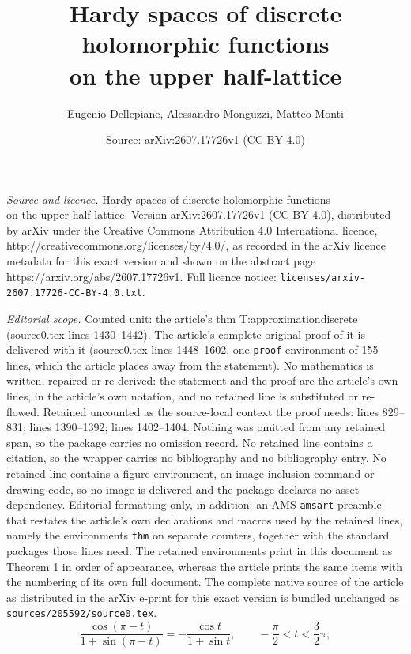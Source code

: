 \documentclass[10pt,a4paper]{amsart}
\title{Hardy spaces of discrete holomorphic functions \\on the upper half-lattice}
\author{Eugenio Dellepiane, Alessandro Monguzzi, Matteo Monti}
\date{Source: arXiv:2607.17726v1 (CC BY 4.0)}
\begin{document}
\maketitle

\noindent\emph{Source and licence.} Hardy spaces of discrete holomorphic functions \\on the upper half-lattice. Version arXiv:2607.17726v1 (CC BY 4.0), distributed by arXiv under the Creative Commons Attribution 4.0 International licence, http://creativecommons.org/licenses/by/4.0/, as recorded in the arXiv licence metadata for this exact version and shown on the abstract page https://arxiv.org/abs/2607.17726v1. Full licence notice: \texttt{licenses/arxiv-2607.17726-CC-BY-4.0.txt}.\par\smallskip

\noindent\textit{Editorial scope.} Counted unit: the article's thm T:approximationdiscrete (source0.tex lines 1430--1442). The article's complete original proof of it is delivered with it (source0.tex lines 1448--1602, one \texttt{proof} environment of 155 lines, which the article places away from the statement). No mathematics is written, repaired or re-derived: the statement and the proof are the article's own lines, in the article's own notation, and no retained line is substituted or re-flowed.  Retained uncounted as the source-local context the proof needs: lines 829--831; lines 1390--1392; lines 1402--1404.  Nothing was omitted from any retained span, so the package carries no omission record.  No retained line contains a citation, so the wrapper carries no bibliography and no bibliography entry.  No retained line contains a figure environment, an image-inclusion command or drawing code, so no image is delivered and the package declares no asset dependency.  Editorial formatting only, in addition: an AMS \texttt{amsart} preamble that restates the article's own declarations and macros used by the retained lines, namely the environments \texttt{thm} on separate counters, together with the standard packages those lines need.  The retained environments print in this document as Theorem 1 in order of appearance, whereas the article prints the same items with the numbering of its own full document.  The complete native source of the article as distributed in the arXiv e-print for this exact version is bundled unchanged as \texttt{sources/205592/source0.tex}.
    \begin{equation}\label{Eq:symmetryphi}
    \frac{\cos (\pi-t)}{1+\sin (\pi-t)}=-\frac{\cos t}{1+\sin t}, \qquad -\frac{\pi}{2}<t<\frac{3}{2}\pi,
    \end{equation}
\end{document}
